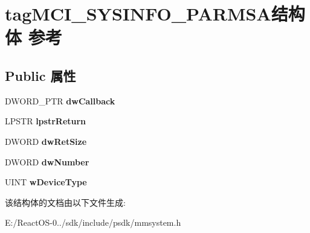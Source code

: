 \hypertarget{structtag_m_c_i___s_y_s_i_n_f_o___p_a_r_m_s_a}{}\section{tag\+M\+C\+I\+\_\+\+S\+Y\+S\+I\+N\+F\+O\+\_\+\+P\+A\+R\+M\+S\+A结构体 参考}
\label{structtag_m_c_i___s_y_s_i_n_f_o___p_a_r_m_s_a}
\subsection*{Public 属性}
\begin{DoxyCompactItemize}
\item 
\mbox{\label{structtag_m_c_i___s_y_s_i_n_f_o___p_a_r_m_s_a_a236e157033dc5f4a26f02521525c5399}} 
D\+W\+O\+R\+D\+\_\+\+P\+TR {\bfseries dw\+Callback}
\item 
\mbox{\label{structtag_m_c_i___s_y_s_i_n_f_o___p_a_r_m_s_a_a31cb0f7a5aab1ad25d358c5a504edffe}} 
L\+P\+S\+TR {\bfseries lpstr\+Return}
\item 
\mbox{\label{structtag_m_c_i___s_y_s_i_n_f_o___p_a_r_m_s_a_a3a40e4b7f1ddcfe44f5d419d97e35032}} 
D\+W\+O\+RD {\bfseries dw\+Ret\+Size}
\item 
\mbox{\label{structtag_m_c_i___s_y_s_i_n_f_o___p_a_r_m_s_a_a13c5f5a998d8f10cbb0f9c12a158a2a7}} 
D\+W\+O\+RD {\bfseries dw\+Number}
\item 
\mbox{\label{structtag_m_c_i___s_y_s_i_n_f_o___p_a_r_m_s_a_a2d5635a91f1be305b84dfd4c2e7ca020}} 
U\+I\+NT {\bfseries w\+Device\+Type}
\end{DoxyCompactItemize}


该结构体的文档由以下文件生成\+:\begin{DoxyCompactItemize}
\item 
E\+:/\+React\+O\+S-\/0../sdk/include/psdk/mmsystem.\+h\end{DoxyCompactItemize}
